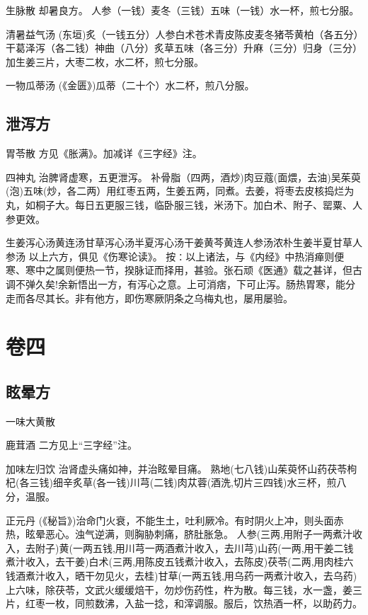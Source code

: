 \documentclass[a4paper,12pt,UTF8,twoside]{ctexbook}
\begin{document}
	生脉散
	却暑良方。
	人参（一钱）麦冬（三钱）五味（一钱）水一杯，煎七分服。
	
	清暑益气汤
	(东垣)炙（一钱五分）人参白术苍术青皮陈皮麦冬猪苓黄柏（各五分）干葛泽泻（各二钱）神曲（八分）炙草五味（各三分）升麻（三分）归身（三分）加生姜三片，大枣二枚，水二杯，煎七分服。
	
	一物瓜蒂汤
	(《金匮》)瓜蒂（二十个）水二杯，煎八分服。
	
	
	
	\chapter{泄泻方}
	
	
	胃苓散
	方见《胀满》。加减详《三字经》注。
	
	四神丸
	治脾肾虚寒，五更泄泻。
	补骨脂（四两，酒炒)肉豆蔻(面煨，去油)吴茱萸(泡)五味(炒，各二两）用红枣五两，生姜五两，同煮。去姜，将枣去皮核捣烂为丸，如桐子大。每日五更服三钱，临卧服三钱，米汤下。加白术、附子、罂粟、人参更效。
	
	生姜泻心汤黄连汤甘草泻心汤半夏泻心汤干姜黄芩黄连人参汤浓朴生姜半夏甘草人参汤
	以上六方，俱见《伤寒论读》。
	按∶以上诸法，与《内经》中热消瘅则便寒、寒中之属则便热一节，揆脉证而择用，甚验。张石顽《医通》载之甚详，但古调不弹久矣!余新悟出一方，有泻心之意。上可消痞，下可止泻。肠热胃寒，能分走而各尽其长。非有他方，即伤寒厥阴条之乌梅丸也，屡用屡验。
	
	

	
	\part{卷四}
	\chapter{眩晕方}	
	
	一味大黄散
	
	鹿茸酒
	二方见上“三字经”注。
	
	加味左归饮
	治肾虚头痛如神，并治眩晕目痛。
	熟地(七八钱)山茱萸怀山药茯苓枸杞(各三钱)细辛炙草(各一钱)川芎(二钱)肉苁蓉(酒洗,切片三四钱)水三杯，煎八分，温服。
	
	正元丹
	(《秘旨》)治命门火衰，不能生土，吐利厥冷。有时阴火上冲，则头面赤热，眩晕恶心。浊气逆满，则胸胁刺痛，脐肚胀急。
	人参(三两,用附子一两煮汁收入，去附子)黄(一两五钱,用川芎一两酒煮汁收入，去川芎)山药(一两,用干姜二钱煮汁收入，去干姜)白术(三两,用陈皮五钱煮汁收入，去陈皮)茯苓(二两,用肉桂六钱酒煮汁收入，晒干勿见火，去桂)甘草(一两五钱,用乌药一两煮汁收入，去乌药)上六味，除茯苓，文武火缓缓焙干，勿炒伤药性，杵为散。每三钱，水一盏，姜三片，红枣一枚，同煎数沸，入盐一捻，和滓调服。服后，饮热酒一杯，以助药力。
	
\end{document}
